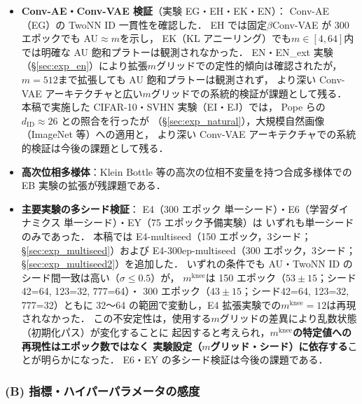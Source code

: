 \documentclass[11pt,a4paper]{jsarticle}
\newcommand{\mknee}{m^{\mathrm{knee}}}
\begin{document}
\begin{itemize}
  \item \textbf{Conv-AE・Conv-VAE 検証}（実験 EG・EH・EK・EN）：
        Conv-AE（EG）の TwoNN ID 一貫性を確認した．
        EH では固定$\beta$Conv-VAE が 300 エポックでも AU$\approx m$を示し，
        EK（KL アニーリング）でも$m\in[4,64]$内では明確な AU 飽和プラトーは観測されなかった．
        EN・EN\_ext 実験（§\ref{sec:exp_en}）により拡張$m$グリッドでの定性的傾向は確認されたが，
        $m=512$まで拡張しても AU 飽和プラトーは観測されず，
        より深い Conv-VAE アーキテクチャと広い$m$グリッドでの系統的検証が課題として残る．
        本稿で実施した CIFAR-10・SVHN 実験（EI・EJ）では，
        Pope ら\cite{pope2021intrinsic}の $d_\mathrm{ID} \approx 26$ との照合を行ったが
        （§\ref{sec:exp_natural}），大規模自然画像（ImageNet 等）への適用と，
        より深い Conv-VAE アーキテクチャでの系統的検証は今後の課題として残る．
  \item \textbf{高次位相多様体}：Klein Bottle 等の高次の位相不変量を持つ合成多様体での
        EB 実験の拡張が残課題である．
  \item \textbf{主要実験の多シード検証}：
        E4（300 エポック 単一シード）・E6（学習ダイナミクス 単一シード）・EY（75 エポック予備実験）は
        いずれも単一シードのみであった．
        本稿では E4-multiseed（150 エポック，3シード；§\ref{sec:exp_multiseed}）および
        E4-300ep-multiseed（300 エポック，3シード；§\ref{sec:exp_multiseed2}）を追加した．
        いずれの条件でも AU・TwoNN ID のシード間一致は高い（$\sigma \leq 0.5$）が，
        $\mknee$は 150 エポック（$53 \pm 15$；シード42=64, 123=32, 777=64）・
        300 エポック（$43 \pm 15$；シード42=64, 123=32, 777=32）ともに
        32〜64 の範囲で変動し，E4 拡張実験での$\mknee = 12$は再現されなかった．
        この不安定性は，使用する$m$グリッドの差異により乱数状態（初期化パス）が変化することに
        起因すると考えられ，\textbf{$\mknee$の特定値への再現性はエポック数ではなく
        実験設定（$m$グリッド・シード）に依存する}ことが明らかになった．
        E6・EY の多シード検証は今後の課題である．
\end{itemize}

\subsubsection*{(B) 指標・ハイパーパラメータの感度}
\end{document}
